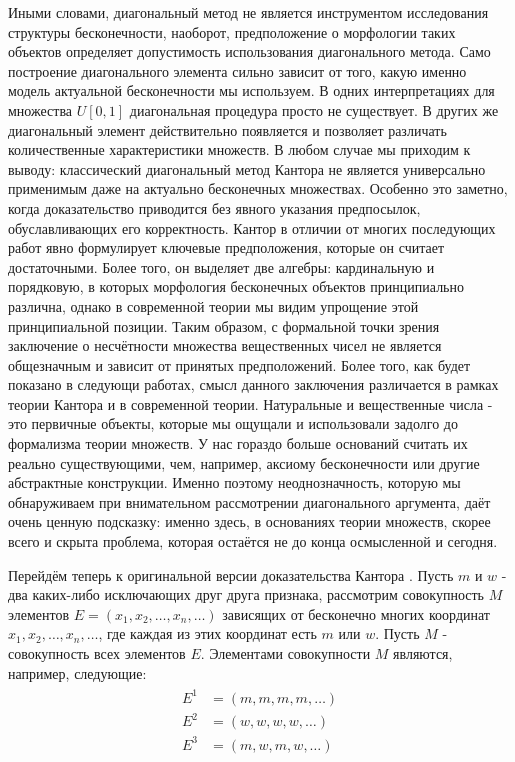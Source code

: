 \documentclass[12pt]{article}
\begin{document}
Иными словами, диагональный метод не является инструментом исследования структуры бесконечности, наоборот, предположение о морфологии таких объектов определяет допустимость использования диагонального метода. Само построение диагонального элемента сильно зависит от того, какую именно модель актуальной бесконечности мы используем. В одних интерпретациях для множества $U[0,1]$ диагональная процедура просто не существует. В других же диагональный элемент действительно появляется и позволяет различать количественные характеристики множеств. В любом случае мы приходим к выводу: классический диагональный метод Кантора не является универсально применимым даже на актуально бесконечных множествах. Особенно это заметно, когда доказательство приводится без явного указания предпосылок, обуславливающих его корректность. Кантор в отличии от многих последующих работ явно формулирует ключевые предположения, которые он считает достаточными. Более того, он выделяет две алгебры: кардинальную и порядковую, в которых морфология бесконечных объектов принципиально различна, однако в современной теории мы видим упрощение этой принципиальной позиции. Таким образом, с формальной точки зрения заключение о несчётности множества вещественных чисел не является общезначным и зависит от принятых предположений. Более того, как будет показано в следующи работах, смысл данного заключения различается в рамках теории Кантора и в современной теории. Натуральные и вещественные числа - это первичные объекты, которые мы ощущали и использовали задолго до формализма теории множеств. У нас гораздо больше оснований считать их реально существующими, чем, например, аксиому бесконечности или другие абстрактные конструкции. Именно поэтому неоднозначность, которую мы обнаруживаем при внимательном рассмотрении диагонального аргумента, даёт очень ценную подсказку: именно здесь, в основаниях теории множеств, скорее всего и скрыта проблема, которая остаётся не до конца осмысленной и сегодня.

Перейдём теперь к оригинальной версии доказательства Кантора \cite{cantor-original}. Пусть $m$ и $w$ - два каких-либо исключающих друг друга признака, рассмотрим совокупность $M$ элементов $E = (x_1, x_2, \dots, x_n, \dots)$ зависящих от бесконечно многих координат $x_1, x_2, \dots, x_n, \dots$, где каждая из этих координат есть $m$ или $w$. Пусть $M$ - совокупность всех элементов $E$. Элементами совокупности $M$ являются, например, следующие:
\begin{align}
\begin{split}
E^1 &= (m, m, m, m, \dots)\\
E^2 &= (w, w, w, w, \dots)\\
E^3 &= (m, w, m, w, \dots)\\
\end{split}
\end{align}
\end{document}
